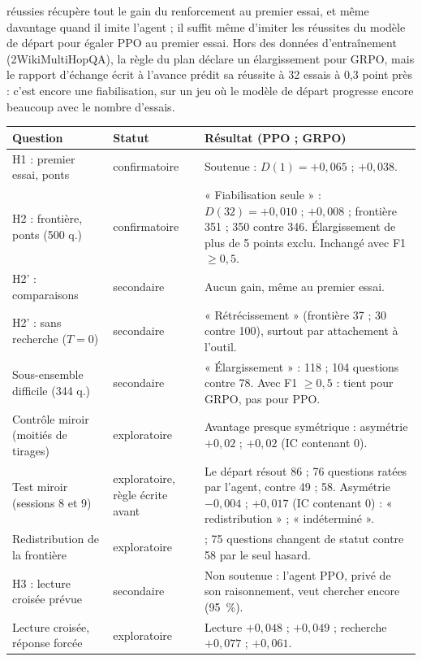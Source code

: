 réussies récupère tout le gain du renforcement au premier essai, et même davantage quand il imite l'agent ; il suffit même d'imiter les réussites du modèle de départ pour égaler PPO au premier essai. Hors des données d'entraînement (2WikiMultiHopQA), la règle du plan déclare un élargissement pour GRPO, mais le rapport d'échange écrit à l'avance prédit sa réussite à 32 essais à 0,3 point près : c'est encore une fiabilisation, sur un jeu où le modèle de départ progresse encore beaucoup avec le nombre d'essais.

\begin{table}[h]\centering\footnotesize\renewcommand{\arraystretch}{1.3}
\begin{tabular}{>{\raggedright\arraybackslash}p{3.6cm}>{\raggedright\arraybackslash}p{1.9cm}>{\raggedright\arraybackslash}p{8.6cm}}
\toprule
Question & Statut & Résultat (PPO ; GRPO) \\
\midrule
H1 : premier essai, ponts & confirmatoire & Soutenue : $D(1) = +0{,}065$ ; $+0{,}038$. \\
H2 : frontière, ponts (500 q.) & confirmatoire & « Fiabilisation seule » : $D(32) = +0{,}010$ ; $+0{,}008$ ; frontière 351 ; 350 contre 346. Élargissement de plus de 5 points exclu. Inchangé avec F1 $\geq 0{,}5$. \\
H2' : comparaisons & secondaire & Aucun gain, même au premier essai. \\
H2' : sans recherche ($T = 0$) & secondaire & « Rétrécissement » (frontière 37 ; 30 contre 100), surtout par attachement à l'outil. \\
Sous-ensemble difficile (344 q.) & secondaire & « Élargissement » : 118 ; 104 questions contre 78. Avec F1 $\geq 0{,}5$ : tient pour GRPO, pas pour PPO. \\
Contrôle miroir (moitiés de tirages) & exploratoire & Avantage presque symétrique : asymétrie $+0{,}02$ ; $+0{,}02$ (IC contenant 0). \\
Test miroir (sessions 8 et 9) & exploratoire, règle écrite avant & Le départ résout 86 ; 76 questions ratées par l'agent, contre 49 ; 58. Asymétrie $-0{,}004$ ; $+0{,}017$ (IC contenant 0) : « redistribution » ; « indéterminé ». \\
Redistribution de la frontière & exploratoire & 91 ; 75 questions changent de statut contre 58 par le seul hasard. \\
H3 : lecture croisée prévue & secondaire & Non soutenue : l'agent PPO, privé de son raisonnement, veut chercher encore (95~\%). \\
Lecture croisée, réponse forcée & exploratoire & Lecture $+0{,}048$ ; $+0{,}049$ ; recherche $+0{,}077$ ; $+0{,}061$. \\

\end{tabular}
\end{table}
